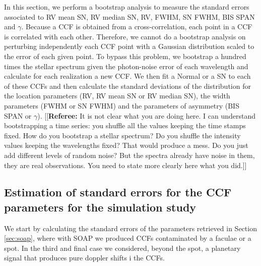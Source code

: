 \documentclass[11pt, oneside]{article}
\newcommand{\comment}[1]{{\color{red}[[\textbf{Referee: }#1]]}}
\begin{document}
{In this section, we perform a bootstrap analysis to measure the standard errors associated to RV mean SN, RV median SN, RV, FWHM, SN FWHM, BIS SPAN and $\gamma$. Because a CCF is obtained from a cross-correlation, each point in a CCF is correlated with each other. Therefore, we cannot do a bootstrap analysis on perturbing independently each CCF point with a Gaussian distribution scaled to the error of each given point. To bypass this problem, we bootstrap a hundred times the stellar spectrum given the photon-noise error of each wavelength and calculate for each realization a new CCF. We then fit a Normal or a SN to each of these CCFs and then calculate the standard deviations of the distribution for the location parameters (RV, RV mean SN or RV median SN), the width parameters (FWHM or SN FWHM) and the parameters of asymmetry (BIS SPAN or $\gamma$).
\comment{It is not clear what you are doing here. I can understand bootstrapping a time series: you shuffle all the values keeping the time stamps fixed. How do you bootstrap a stellar spectrum? Do you shuffle the intensity values keeping the wavelengths fixed? That would produce a mess. Do you just add different levels of random noise? But the spectra already have noise in them, they are real observations. You need to state more clearly here what you did.}

\subsection{Estimation of standard errors for the CCF parameters for the simulation study} \label{sec:bootstrap_soap}

We start by calculating the standard errors of the parameters retrieved in Section \ref{sec:soap}, where with SOAP we produced CCFs contaminated by a faculae or a spot. In the third and final case we considered, beyond the spot, a planetary signal that produces pure doppler shifts i the CCFs.

}
\end{document}
